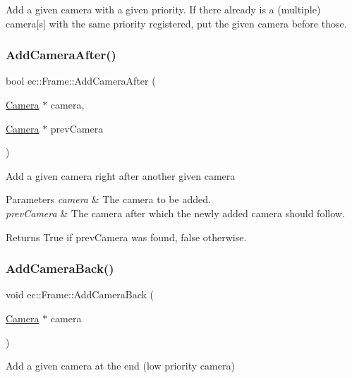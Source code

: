 Add a given camera with a given priority. If there already is a (multiple) camera\mbox{[}s\mbox{]} with the same priority registered, put the given camera before those. \mbox{\label{classec_1_1_frame_aa7cccffd1e0919e75faa35d1f38da5c1}} 
\subsubsection{\texorpdfstring{Add\+Camera\+After()}{AddCameraAfter()}}
{\footnotesize\ttfamily bool ec\+::\+Frame\+::\+Add\+Camera\+After (\begin{DoxyParamCaption}\item[{\mbox{\hyperlink{classec_1_1_camera}{Camera}} $\ast$}]{camera,  }\item[{\mbox{\hyperlink{classec_1_1_camera}{Camera}} $\ast$}]{prev\+Camera }\end{DoxyParamCaption})}

Add a given camera right after another given camera 
\begin{DoxyParams}{Parameters}
{\em camera} & The camera to be added. \\
\hline
{\em prev\+Camera} & The camera after which the newly added camera should follow. \\
\hline
\end{DoxyParams}
\begin{DoxyReturn}{Returns}
True if prev\+Camera was found, false otherwise. 
\end{DoxyReturn}
\mbox{\label{classec_1_1_frame_a06d07d0b719d2941c0334f4b54694348}} 
\subsubsection{\texorpdfstring{Add\+Camera\+Back()}{AddCameraBack()}}
{\footnotesize\ttfamily void ec\+::\+Frame\+::\+Add\+Camera\+Back (\begin{DoxyParamCaption}\item[{\mbox{\hyperlink{classec_1_1_camera}{Camera}} $\ast$}]{camera }\end{DoxyParamCaption})}

Add a given camera at the end (low priority camera) \mbox{\label{classec_1_1_frame_ae75241fcbc4c499a1ac3a1a084d546ae}} 
